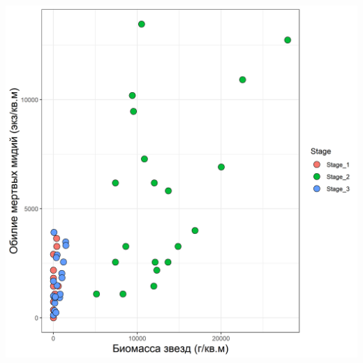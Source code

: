 \documentclass[a0,portrait]{a0poster}
\begin{document}
\begin{multicols}{2}
\begin{minipage}[t]{0.46\linewidth}
\begin{center}
			\includegraphics[width=0.9\linewidth]{Baster_N_dead.png}
			\label{Baster_Ndead}
		\end{center}\vspace{0.5cm}
\end{minipage}



\end{multicols}
\end{document}
